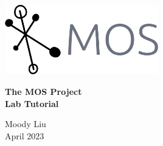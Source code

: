 \documentclass[a4paper,12pt]{report}
\begin{document}
\begin{titlepage}
    \vspace*{5cm}
    \begin{center}
        \includegraphics[width=0.5\textwidth]{assets/logo-no-background.png}
    \end{center}

    \vspace{1cm}

    \begin{center}
        \textbf{\huge The MOS Project}\\
        \vspace{0.5cm}
        \textbf{\large Lab Tutorial}

        \vspace{5cm}
        Moody Liu\\
        April 2023
    \end{center}
\end{titlepage}

\tableofcontents






\end{document}
